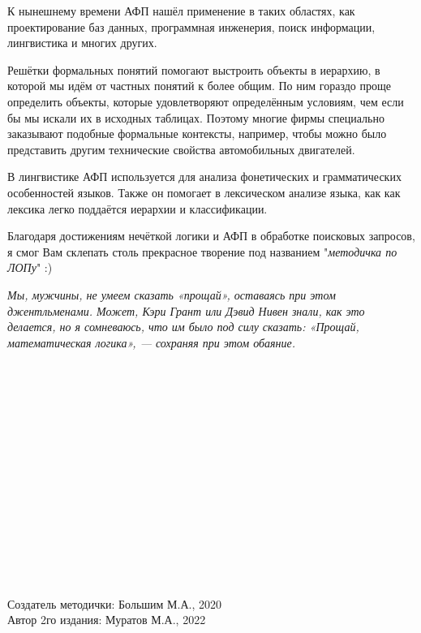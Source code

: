 \documentclass[18pt, a4paper]{extarticle}
\begin{document}
К нынешнему времени АФП нашёл применение в таких областях, как проектирование баз данных, программная инженерия, поиск информации, лингвистика и многих других.

Решётки формальных понятий помогают выстроить объекты в иерархию, в которой мы идём от частных понятий к более общим. По ним гораздо проще определить объекты, которые удовлетворяют определённым условиям, чем если бы мы искали
их в исходных таблицах. Поэтому многие фирмы специально заказывают подобные формальные контексты, например, чтобы можно было представить другим технические свойства автомобильных двигателей.

В лингвистике АФП используется для анализа фонетических и грамматических особенностей языков. Также он помогает в лексическом анализе языка, как как лексика легко поддаётся иерархии и классификации.

Благодаря достижениям нечёткой логики и АФП в обработке поисковых запросов, я смог Вам склепать столь прекрасное творение под названием "\textit{методичка по ЛОПу}"{} :) \\

\begin{center}
    \textit{Мы, мужчины, не умеем сказать «прощай», оставаясь при этом джентльменами. Может, Кэри Грант или Дэвид Нивен знали, как это делается, но я сомневаюсь, что им было под силу сказать: «Прощай, математическая логика», — сохраняя при этом обаяние.}
\end{center}
\leavevmode\\\\\leavevmode\\\\\leavevmode\\\\\leavevmode\\\\\leavevmode\\\\\leavevmode\\\\\leavevmode\\\\
\begin{flushright}
	Создатель методички: Большим М.А., 2020\\
	Автор 2го издания: Муратов М.А., 2022
\end{flushright}
\end{document}
